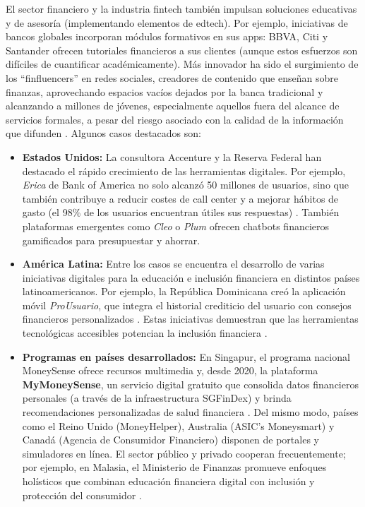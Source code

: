 El sector financiero y la industria fintech también impulsan soluciones educativas y de asesoría (implementando elementos de edtech). Por ejemplo, iniciativas de bancos globales incorporan módulos formativos en sus apps: BBVA, Citi y Santander ofrecen tutoriales financieros a sus clientes (aunque estos esfuerzos son difíciles de cuantificar académicamente). Más innovador ha sido el surgimiento de los ``finfluencers'' en redes sociales, creadores de contenido que enseñan sobre finanzas, aprovechando espacios vacíos dejados por la banca tradicional y alcanzando a millones de jóvenes, especialmente aquellos fuera del alcance de servicios formales, a pesar del riesgo asociado con la calidad de la información que difunden \parencite{RTVE01}. Algunos casos destacados son:

\begin{itemize}
	\item \textbf{Estados Unidos:} La consultora Accenture y la Reserva Federal han destacado el rápido crecimiento de las herramientas digitales. Por ejemplo, \textit{Erica} de Bank of America no solo alcanzó 50 millones de usuarios, sino que también contribuye a reducir costes de call center y a mejorar hábitos de gasto (el 98\% de los usuarios encuentran útiles sus respuestas) \parencite{FundsSociety01}. También plataformas emergentes como \textit{Cleo} o \textit{Plum} ofrecen chatbots financieros gamificados para presupuestar y ahorrar.
	
	\item \textbf{América Latina:} Entre los casos se encuentra el desarrollo de varias iniciativas digitales para la educación e inclusión financiera en distintos países latinoamericanos. Por ejemplo, la República Dominicana creó la aplicación móvil \textit{ProUsuario}, que integra el historial crediticio del usuario con consejos financieros personalizados \parencite{RDominicana01}. Estas iniciativas demuestran que las herramientas tecnológicas accesibles potencian la inclusión financiera \parencite[p. 28]{RevistaCientifica01}.
	
	\item \textbf{Programas en países desarrollados:} En Singapur, el programa nacional MoneySense ofrece recursos multimedia y, desde 2020, la plataforma \textbf{MyMoneySense}, un servicio digital gratuito que consolida datos financieros personales (a través de la infraestructura SGFinDex) y brinda recomendaciones personalizadas de salud financiera \parencite{MoneySense01}. Del mismo modo, países como el Reino Unido (MoneyHelper), Australia (ASIC’s Moneysmart) y Canadá (Agencia de Consumidor Financiero) disponen de portales y simuladores en línea. El sector público y privado cooperan frecuentemente; por ejemplo, en Malasia, el Ministerio de Finanzas promueve enfoques holísticos que combinan educación financiera digital con inclusión y protección del consumidor \parencite{Malasia01}.
	

\end{itemize}
